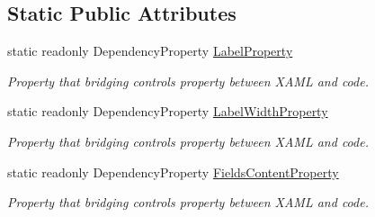 \subsection*{Static Public Attributes}
\begin{DoxyCompactItemize}
\item 
static readonly Dependency\+Property \mbox{\hyperlink{class_wpf_handler_1_1_u_i_1_1_controls_1_1_flat_toggles_group_a72591a66a8b72130cf16e966bbed5507}{Label\+Property}}
\begin{DoxyCompactList}\small\item\em Property that bridging control\textquotesingle{}s property between X\+A\+ML and code. \end{DoxyCompactList}\item 
static readonly Dependency\+Property \mbox{\hyperlink{class_wpf_handler_1_1_u_i_1_1_controls_1_1_flat_toggles_group_acd4cc98db2da7479ac81dd03ceaadcae}{Label\+Width\+Property}}
\begin{DoxyCompactList}\small\item\em Property that bridging control\textquotesingle{}s property between X\+A\+ML and code. \end{DoxyCompactList}\item 
static readonly Dependency\+Property \mbox{\hyperlink{class_wpf_handler_1_1_u_i_1_1_controls_1_1_flat_toggles_group_a2df8b183c4855b48d46fe14730225db4}{Fields\+Content\+Property}}
\begin{DoxyCompactList}\small\item\em Property that bridging control\textquotesingle{}s property between X\+A\+ML and code. \end{DoxyCompactList}\end{DoxyCompactItemize}
